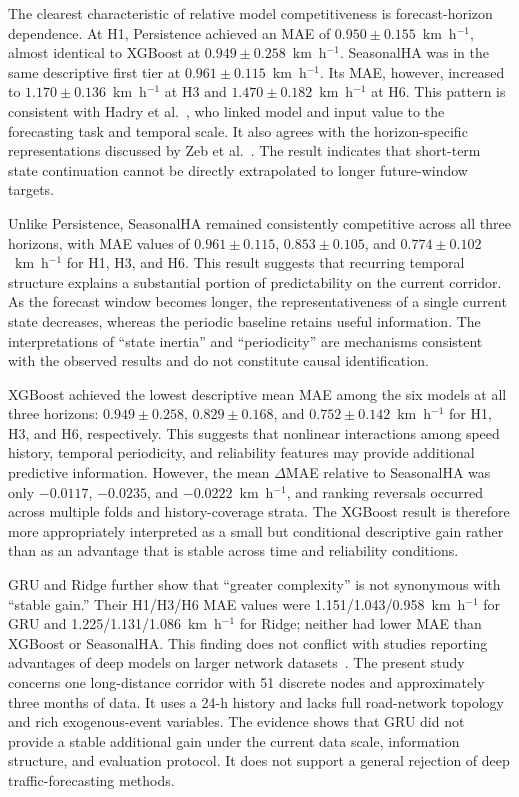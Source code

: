 \documentclass[pdflatex,sn-mathphys-num,iicol]{sn-jnl}
\begin{document}
The clearest characteristic of relative model competitiveness is forecast-horizon dependence. At H1, Persistence achieved an MAE of $0.950 \pm 0.155$~km~h$^{-1}$, almost identical to XGBoost at $0.949 \pm 0.258$~km~h$^{-1}$. SeasonalHA was in the same descriptive first tier at $0.961 \pm 0.115$~km~h$^{-1}$. Its MAE, however, increased to $1.170 \pm 0.136$~km~h$^{-1}$ at H3 and $1.470 \pm 0.182$~km~h$^{-1}$ at H6. This pattern is consistent with Hadry et al.~\cite{Hadry2025TrafficForecasting}, who linked model and input value to the forecasting task and temporal scale. It also agrees with the horizon-specific representations discussed by Zeb et al.~\cite{Zeb2024FeatureProjection}. The result indicates that short-term state continuation cannot be directly extrapolated to longer future-window targets.

Unlike Persistence, SeasonalHA remained consistently competitive across all three horizons, with MAE values of $0.961 \pm 0.115$, $0.853 \pm 0.105$, and $0.774 \pm 0.102$~km~h$^{-1}$ for H1, H3, and H6. This result suggests that recurring temporal structure explains a substantial portion of predictability on the current corridor. As the forecast window becomes longer, the representativeness of a single current state decreases, whereas the periodic baseline retains useful information. The interpretations of ``state inertia'' and ``periodicity'' are mechanisms consistent with the observed results and do not constitute causal identification.

XGBoost achieved the lowest descriptive mean MAE among the six models at all three horizons: $0.949 \pm 0.258$, $0.829 \pm 0.168$, and $0.752 \pm 0.142$~km~h$^{-1}$ for H1, H3, and H6, respectively. This suggests that nonlinear interactions among speed history, temporal periodicity, and reliability features may provide additional predictive information. However, the mean $\Delta$MAE relative to SeasonalHA was only $-0.0117$, $-0.0235$, and $-0.0222$~km~h$^{-1}$, and ranking reversals occurred across multiple folds and history-coverage strata. The XGBoost result is therefore more appropriately interpreted as a small but conditional descriptive gain rather than as an advantage that is stable across time and reliability conditions.

GRU and Ridge further show that ``greater complexity'' is not synonymous with ``stable gain.'' Their H1/H3/H6 MAE values were 1.151/1.043/0.958~km~h$^{-1}$ for GRU and 1.225/1.131/1.086~km~h$^{-1}$ for Ridge; neither had lower MAE than XGBoost or SeasonalHA. This finding does not conflict with studies reporting advantages of deep models on larger network datasets~\cite{Cini2024DeepEnsemble,Liu2024SpatialTemporalTransformer,Yu2024AutoformerFCD}. The present study concerns one long-distance corridor with 51 discrete nodes and approximately three months of data. It uses a 24-h history and lacks full road-network topology and rich exogenous-event variables. The evidence shows that GRU did not provide a stable additional gain under the current data scale, information structure, and evaluation protocol. It does not support a general rejection of deep traffic-forecasting methods.
\end{document}
